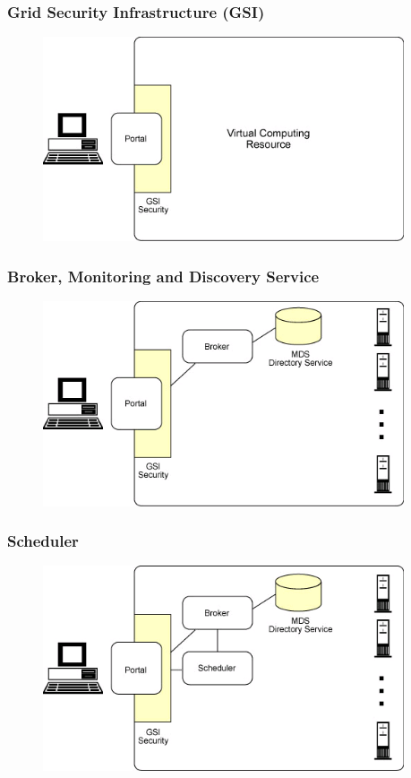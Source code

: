 \documentclass{beamer}
\begin{document}
\begin{frame}[label=main2]
 \frametitle{Grid Security Infrastructure (GSI)} 
\begin{figure}[t]
\centering
\includegraphics[width=0.95\textwidth]{imgs/key2}
\end{figure}
\end{frame}

\begin{frame}[label=main2]
 \frametitle{Broker, Monitoring and Discovery Service} 
\begin{figure}[t]
\centering
\includegraphics[width=0.95\textwidth]{imgs/key3}
\end{figure}
\end{frame}

\begin{frame}[label=main2]
 \frametitle{Scheduler} 
\begin{figure}[t]
\centering
\includegraphics[width=0.95\textwidth]{imgs/key4}
\end{figure}
\end{frame}
\end{document}
